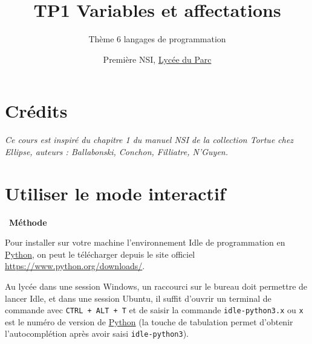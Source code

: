 \documentclass[
  11pt,
]{article}
\title{TP1 Variables et affectations}
\subtitle{Thème 6 langages de programmation}
\author{Première NSI, \href{https://frederic-junier.org/}{Lycée du
Parc}}
\date{}
\newcommand{\passthrough}[1]{#1}
\newcounter{cours}
\newcounter{prog}
\newenvironment{methode}[1]
{\par \medskip    \noindent  
 \begin {bclogo}[arrondi =0.1,logo=\bcoutil, marge=4,noborder = true] {~\textbf{Méthode}   {\itshape #1} }  \par}
{
\end{bclogo}
 \par \bigskip }
\begin{document}
\maketitle

\hypertarget{cruxe9dits}{%
\section*{Crédits}\label{cruxe9dits}}

\emph{Ce cours est inspiré du chapitre 1 du manuel NSI de la collection
Tortue chez Ellipse, auteurs : Ballabonski, Conchon, Filliatre,
N'Guyen.}

\hypertarget{utiliser-le-mode-interactif}{%
\section{Utiliser le mode
interactif}\label{utiliser-le-mode-interactif}}

\begin{methode}{}

Pour installer sur votre machine l'environnement Idle de programmation
en
\href{https://docs.python.org/3/tutorial/datastructures.html}{Python},
on peut le télécharger depuis le site officiel
\url{https://www.python.org/downloads/}.

Au lycée dans une session Windows, un raccourci sur le bureau doit
permettre de lancer Idle, et dans une session Ubuntu, il suffit d'ouvrir
un terminal de commande avec \passthrough{\lstinline!CTRL + ALT + T!} et
de saisir la commande \passthrough{\lstinline!idle-python3.x!} ou
\passthrough{\lstinline!x!} est le numéro de version de
\href{https://docs.python.org/3/tutorial/datastructures.html}{Python}
(la touche de tabulation permet d'obtenir l'autocomplétion après avoir
saisi \passthrough{\lstinline!idle-python3!}).

\end{methode}
\end{document}
